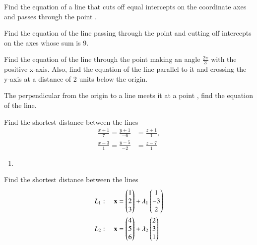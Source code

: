 \item Find the equation of a line that cuts off equal intercepts on the coordinate axes and passes through the point .
\\
\solution

\item Find the equation of the line passing through the point  and cutting off intercepts on the axes whose sum is 9.
\item Find the equation of the line through the point  making an angle $\frac{2\pi}{3}$ with the positive x-axis.  Also, find the equation of the line parallel to it and crossing the y-axis at a distance of 2 units below the origin.
\\
\solution

%
\item The perpendicular from the origin to a line meets it at a point , find the equation of the line.
\\
\solution


%
\item Find the shortest distance between the lines 
\begin{align}
\frac{x+1}{7} = \frac{y+1}{-6} &= \frac{z+1}{1}, 
\\
\frac{x-3}{1} = \frac{y-5}{-2} &= \frac{z-7}{1} 
\end{align}
%
\solution 
\begin{enumerate}
\item 
\end{enumerate}
\item Find the shortest distance between the lines 
\begin{align}
L_1: \quad \mathbf{x} &= \begin{pmatrix}1\\2\\3\end{pmatrix} + \lambda_1\begin{pmatrix}1 \\ -3 \\2\end{pmatrix}
\\
L_2: \quad \mathbf{x} &= \begin{pmatrix}4\\5\\6\end{pmatrix} + \lambda_2\begin{pmatrix}2 \\ 3 \\1\end{pmatrix}
\end{align}
%
\solution 


